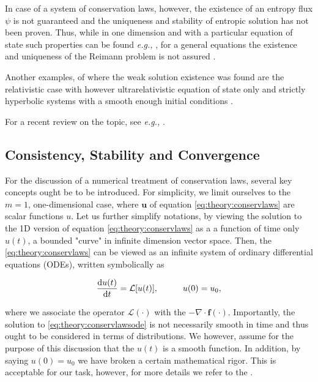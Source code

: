 \documentclass[11pt,a4paper,headinclude=true,DIV=14,BCOR=8mm,chapterprefix,listof=totoc,twoside,openright,abstracton]{scrbook}
\begin{document}
In case of a system of conservation laws, however, the existence of an entropy flux $\psi$ is not guaranteed and the uniqueness and stability of entropic solution has not been proven. 
Thus, while in one dimension and with a particular equation of state such properties can be found \textit{e.g.,} \cite{Chen:2009}, for a general equations the existence and uniqueness of the Reimann problem is not assured \cite{Curtis:1972}.

Another examples, of where the weak solution existence was found are the relativistic case \cite{Glimm:1965} with however ultrarelativistic equation of state only \cite{Smoller:1993} and strictly hyperbolic systems with a smooth enough initial conditions \cite{Lax:1957}.

For a recent review on the topic, see \textit{e.g.,} \cite{Chen:2006}. 


\subsection{Consistency, Stability and Convergence}

For the discussion of a numerical treatment of conservation laws, several key concepts ought be to be introduced. For simplicity, we limit ourselves to the $m=1$, one-dimensional case, where $\boldsymbol{u}$ of equation \ref{eq:theory:conservlaws} are scalar functions $u$. Let us further simplify notations, by viewing the solution to the 1D version of equation \ref{eq:theory:conservlaws} as a a function of time only $u(t)$, a bounded "curve" in infinite dimension vector space. Then, the \ref{eq:theory:conservlaws} can be viewed as an infinite system of ordinary differential equations (ODEs), written symbolically as

\begin{equation}
\frac{\text{d}u(t)}{\text{d}t} = \mathcal{L}[u(t)], \hspace{10mm} u(0) = u_0,
\label{eq:theory:conservlawsode}
\end{equation}

where we associate the operator $\mathcal{L}(\cdot)$ with the $-\nabla\cdot\boldsymbol{f}(\cdot)$. 
Importantly, the solution to \ref{eq:theory:conservlawsode} is not necessarily smooth in time and thus ought to be considered in terms of distributions. We however, assume for the purpose of this discussion that the $u(t)$ is a smooth function. In addition, by saying $u(0) = u_0$ we have broken a certain mathematical rigor. This is acceptable for our task, however, for more details we refer to the \cite{Kruzkov:1970}. 
\end{document}

